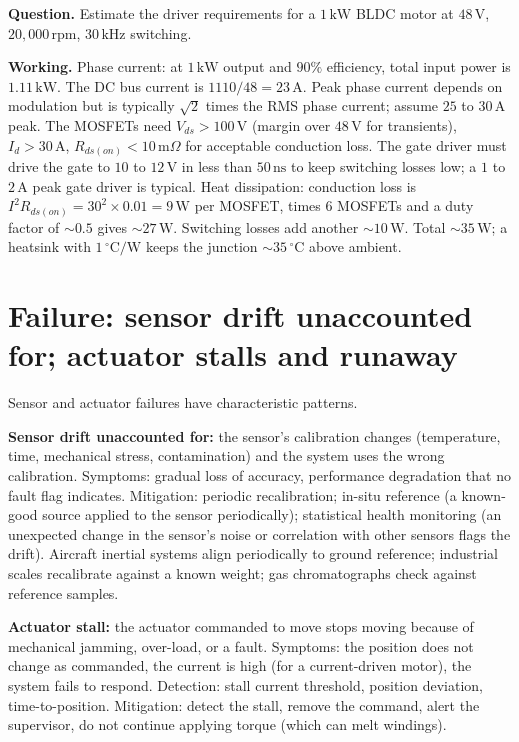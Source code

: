 \begin{estimation}
\textbf{Question.} Estimate the driver requirements for a $1\,\text{kW}$ BLDC motor at $48\,\text{V}$, $20{,}000\,\text{rpm}$, $30\,\text{kHz}$ switching.

\textbf{Working.} Phase current: at $1\,\text{kW}$ output and $90\%$ efficiency, total input power is $1.11\,\text{kW}$. The DC bus current is $1110/48 = 23\,\text{A}$. Peak phase current depends on modulation but is typically $\sqrt{2}$ times the RMS phase current; assume $25$ to $30\,\text{A}$ peak. The MOSFETs need $V_{ds} > 100\,\text{V}$ (margin over $48\,\text{V}$ for transients), $I_d > 30\,\text{A}$, $R_{ds(on)} < 10\,\text{m}\Omega$ for acceptable conduction loss. The gate driver must drive the gate to $10$ to $12\,\text{V}$ in less than $50\,\text{ns}$ to keep switching losses low; a $1$ to $2\,\text{A}$ peak gate driver is typical. Heat dissipation: conduction loss is $I^2 R_{ds(on)} = 30^2 \times 0.01 = 9\,\text{W}$ per MOSFET, times $6$ MOSFETs and a duty factor of $\sim 0.5$ gives $\sim 27\,\text{W}$. Switching losses add another $\sim 10\,\text{W}$. Total $\sim 35\,\text{W}$; a heatsink with $1\,^\circ\text{C}/\text{W}$ keeps the junction $\sim 35\,^\circ\text{C}$ above ambient.
\end{estimation}

\section{Failure: sensor drift unaccounted for; actuator stalls and runaway}

Sensor and actuator failures have characteristic patterns.

\textbf{Sensor drift unaccounted for:} the sensor's calibration changes (temperature, time, mechanical stress, contamination) and the system uses the wrong calibration. Symptoms: gradual loss of accuracy, performance degradation that no fault flag indicates. Mitigation: periodic recalibration; in-situ reference (a known-good source applied to the sensor periodically); statistical health monitoring (an unexpected change in the sensor's noise or correlation with other sensors flags the drift). Aircraft inertial systems align periodically to ground reference; industrial scales recalibrate against a known weight; gas chromatographs check against reference samples.

\textbf{Actuator stall:} the actuator commanded to move stops moving because of mechanical jamming, over-load, or a fault. Symptoms: the position does not change as commanded, the current is high (for a current-driven motor), the system fails to respond. Detection: stall current threshold, position deviation, time-to-position. Mitigation: detect the stall, remove the command, alert the supervisor, do not continue applying torque (which can melt windings).

